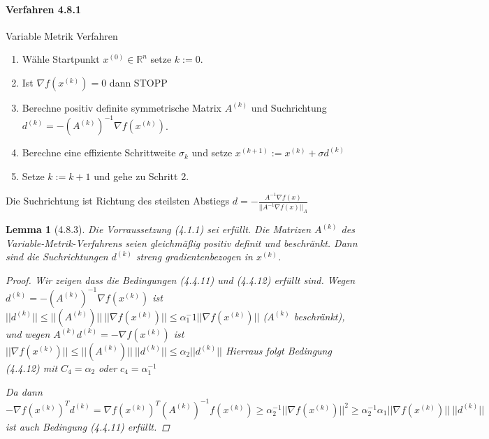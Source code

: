 \documentclass[ngerman,halfparskip]{scrartcl}
\newtheorem*{lemma}{Lemma}
\theoremstyle{definition}
\def\R{\mathbb R}
\begin{document}
\paragraph{Verfahren 4.8.1} Variable Metrik Verfahren
\begin{enumerate}
\item Wähle Startpunkt $x^{(0)}\in\R^n$ setze $k:=0$.
\item Ist $\nabla f(x^{(k)})=0$ dann STOPP
\item Berechne positiv definite symmetrische Matrix $A^{(k)}$ und Suchrichtung $d^{(k)}=-(A^{(k)})^{-1}\nabla f(x^{(k)})$.
\item Berechne eine effiziente Schrittweite $\sigma_k$ und setze $x^{(k+1)}:=x^{(k)}+\sigma d^{(k)}$
\item Setze $k:=k+1$ und gehe zu Schritt 2.
\end{enumerate}

Die Suchrichtung ist Richtung des steilsten Abstiegs $d=-\frac{A^{-1}\nabla f(x)}{||A^{-1}\nabla f(x)||_A}$

\begin{lemma}[4.8.3]
Die Vorraussetzung (4.1.1) sei erfüllt. Die Matrizen $A^ {(k)}$ des Variable-Metrik-Verfahrens seien gleichmäßig positiv definit und beschränkt. Dann sind die Suchrichtungen $d^{(k)}$ streng gradientenbezogen in $x^{(k)}$.
\begin{proof}
Wir zeigen dass die Bedingungen (4.4.11) und (4.4.12) erfüllt sind. Wegen $d^{(k)}=-(A^{(k)})^{-1}\nabla f(x^{(k)})$ ist $||d^{(k)}|| \leq ||(A^{(k)})||~||\nabla f(x^{(k)})||\leq \alpha_1^-1 ||\nabla f(x^{(k)})||$ ($A^{(k)}$ beschränkt), und wegen $A^{(k)}d^{(k)}=-\nabla f(x^{(k)})$ ist $||\nabla f(x^{(k)})||\leq  ||(A^{(k)})||~||d^{(k)}||\leq \alpha_2 ||d^{(k)}||$ Hierraus folgt Bedingung (4.4.12) mit $C_4=\alpha_2$ oder $c_4=\alpha_1^{-1}$ 

Da dann $-\nabla f(x^{(k)})^Td^{(k)}=\nabla f(x^{(k)})^T(A^{(k)})^{-1}f(x^{(k)})\geq \alpha_2^{-1}||\nabla f(x^{(k)})||^2\geq \alpha_2^{-1}\alpha_1 ||\nabla f(x^{(k)})||~||d^{(k)}||$ ist auch Bedingung (4.4.11) erfüllt.
\end{proof}
\end{lemma}
\end{document}

